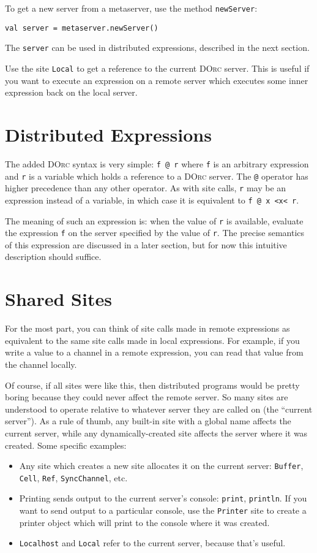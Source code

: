 \documentclass[10pt,letterpaper]{article}
\begin{document}
To get a new server from a metaserver, use the method \texttt{newServer}:
\begin{verbatim}
val server = metaserver.newServer()
\end{verbatim}
The \texttt{server} can be used in distributed expressions, described in the
next section.

Use the site \texttt{Local} to get a reference to the current \textsc{DOrc}
server. This is useful if you want to execute an expression on a
remote server which executes some inner expression back on the local server.

\section{Distributed Expressions}

The added \textsc{DOrc} syntax is very simple: \texttt{f @ r} where \texttt{f}
is an arbitrary expression and \texttt{r} is a variable which holds a reference
to a \textsc{DOrc} server. The \texttt{@} operator has higher precedence than
any other operator. As with site calls, \texttt{r} may be an expression instead
of a variable, in which case it is equivalent to \texttt{f @ x <x< r}.

The meaning of such an expression is: when the value of \texttt{r} is
available, evaluate the expression \texttt{f} on the server specified by the
value of \texttt{r}. The precise semantics of this expression are discussed in
a later section, but for now this intuitive description should suffice.

\section{Shared Sites}

For the most part, you can think of site calls made in remote expressions as
equivalent to the same site calls made in local expressions. For example, if
you write a value to a channel in a remote expression, you can read that value
from the channel locally.

Of course, if all sites were like this, then distributed programs would be
pretty boring because they could never affect the remote server. So many sites
are understood to operate relative to whatever server they are called on (the
``current server''). As a rule of thumb, any built-in site with a global name
affects the current server, while any dynamically-created site affects the
server where it was created. Some specific examples:
\begin{itemize}
\item Any site which creates a new site allocates it on the current
server: \texttt{Buffer}, \texttt{Cell}, \texttt{Ref}, \texttt{SyncChannel}, etc.
\item Printing sends output to the current server's console: \texttt{print},
\texttt{println}. If you want to send output to a particular console, use the
\texttt{Printer} site to create a printer object which will print to the
console where it was created.
\item \texttt{Localhost} and \texttt{Local} refer to the current server, because that's useful.
\end{itemize}
\end{document}
